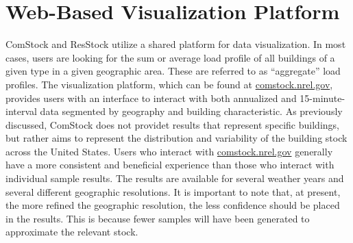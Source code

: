 \section{Web-Based Visualization Platform}
\label{dataviewer}
ComStock and ResStock utilize a shared platform for data visualization. In most cases, users are looking for the sum or average load profile of all buildings of a given type in a given geographic area. These are referred to as ``aggregate'' load profiles. The visualization platform, which can be found at \href{comstock.nrel.gov}{comstock.nrel.gov}, provides users with an interface to interact with both annualized and 15-minute-interval data segmented by geography and building characteristic. As previously discussed, ComStock does not providet results that represent specific buildings, but rather aims to represent the distribution and variability of the building stock across the United States. Users who interact with \href{comstock.nrel.gov}{comstock.nrel.gov} generally have a more consistent and beneficial experience than those who interact with individual sample results. The results are available for several weather years and several different geographic resolutions. It is important to note that, at present, the more refined the geographic resolution, the less confidence should be placed in the results. This is because fewer samples will have been generated to approximate the relevant stock.